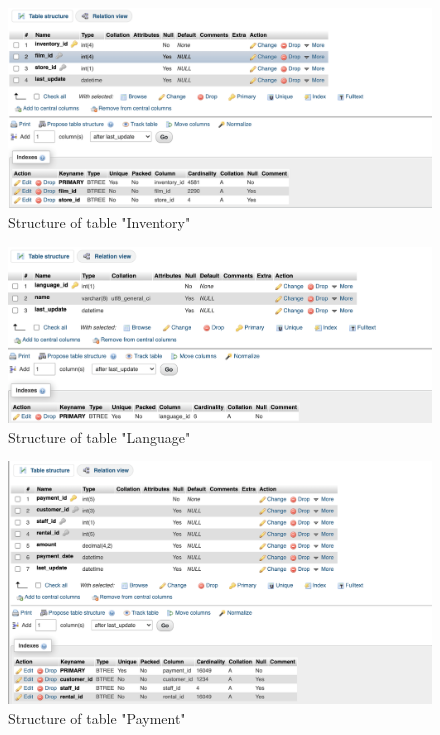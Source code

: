\documentclass{article}
\begin{document}
	\begin{figure}[H]
		\includegraphics[width=\textwidth]{table_inventory_struct}
		\caption{Structure of table "Inventory"}	
	\end{figure}
	\begin{figure}[H]
		\includegraphics[width=\textwidth]{table_language_struct}
		\caption{Structure of table "Language"}	
	\end{figure}
	\begin{figure}[H]
		\includegraphics[width=\textwidth]{table_payment_struct}
		\caption{Structure of table "Payment"}	
	\end{figure}
\end{document}

